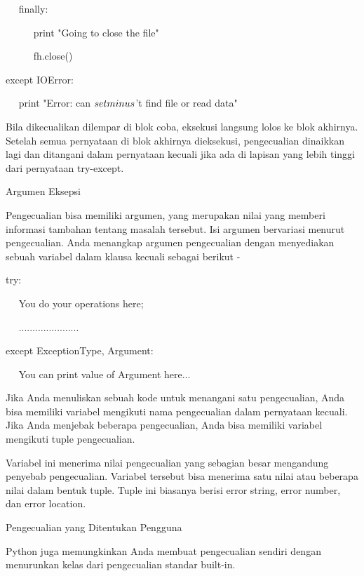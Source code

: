 ~~ finally: \par
~~~~~ print "Going to close the file" \par
~~~~~ fh.close() \par
except IOError: \par
~~ print "Error: can $  \\setminus  $'t find file or read data" \par
\vspace{12pt}
\vspace{12pt}
Bila dikecualikan dilempar di blok coba, eksekusi langsung lolos ke blok akhirnya. Setelah semua pernyataan di blok akhirnya dieksekusi, pengecualian dinaikkan lagi dan ditangani dalam pernyataan kecuali jika ada di lapisan yang lebih tinggi dari pernyataan try-except. \par
Argumen Eksepsi \par
\vspace{12pt}
Pengecualian bisa memiliki argumen, yang merupakan nilai yang memberi informasi tambahan tentang masalah tersebut. Isi argumen bervariasi menurut pengecualian. Anda menangkap argumen pengecualian dengan menyediakan sebuah variabel dalam klausa kecuali sebagai berikut - \par
\vspace{12pt}
try: \par
~~ You do your operations here; \par
~~ ...................... \par
except ExceptionType, Argument: \par
~~ You can print value of Argument here... \par
\vspace{12pt}
Jika Anda menuliskan sebuah kode untuk menangani satu pengecualian, Anda bisa memiliki variabel mengikuti nama pengecualian dalam pernyataan kecuali. Jika Anda menjebak beberapa pengecualian, Anda bisa memiliki variabel mengikuti tuple pengecualian. \par
\vspace{12pt}
Variabel ini menerima nilai pengecualian yang sebagian besar mengandung penyebab pengecualian. Variabel tersebut bisa menerima satu nilai atau beberapa nilai dalam bentuk tuple. Tuple ini biasanya berisi error string, error number, dan error location. \par
\vspace{12pt}
Pengecualian yang Ditentukan Pengguna \par
\vspace{12pt}
Python juga memungkinkan Anda membuat pengecualian sendiri dengan menurunkan kelas dari pengecualian standar built-in. \par
